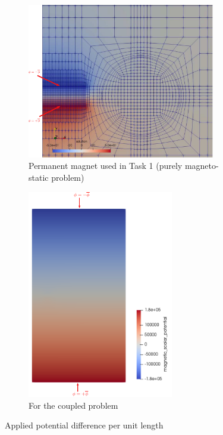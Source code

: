 \documentclass[11pt,a4paper,final]{article}
\begin{document}
\begin{figure}[h]
\centering
\begin{subfigure}{0.35\textwidth}
\centering
\includegraphics[width=0.9\textwidth]{applied_mag_pot_magnet.pdf}
\caption{Permanent magnet used in Task 1 (purely magneto-static problem)}
\label{fig:3.4.1}
\end{subfigure}
\begin{subfigure}{0.5\textwidth}
\centering
\includegraphics[width=0.7\textwidth]{magnetic_potential_coupled_problem.pdf}
\caption{For the coupled problem}
\label{fig:3.4.2}
\end{subfigure}
\caption{Applied potential difference per unit length}
\label{fig:3.4}
\end{figure}
\end{document}
